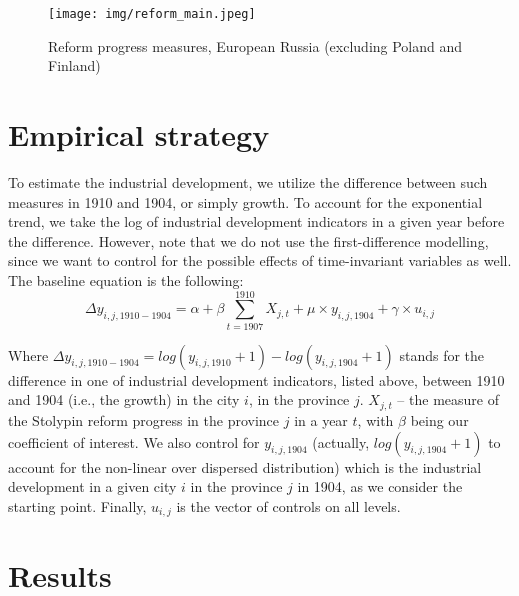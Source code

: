 \documentclass[a4paper, 12pt]{article}
\begin{document}
    
    \begin{figure}[!htbp]
        \centering
        \texttt{[image: img/reform\_main.jpeg]}
        \caption{Reform progress measures, European Russia (excluding Poland and Finland)}
        \label{fig:prog}
    \end{figure}
    
    
    
\section{Empirical strategy}    
    
    \noindent To estimate the industrial development, we utilize the difference between such measures in 1910 and 1904, or simply growth. To account for the exponential trend, we take the log of industrial development indicators in a given year before the difference. However, note that we do not use the first-difference modelling, since we want to control for the possible effects of time-invariant variables as well. The baseline equation is the following:
    \begin{equation}\label{eq:baseline}
        \Delta y_{i,j,1910-1904} = \alpha + \beta \sum_{t=1907}^{1910} X_{j,t} + \mu \times y_{i,j,1904} + \gamma \times u_{i,j}
    \end{equation}
    
    \noindent Where $\Delta y_{i,j,1910-1904} = log(y_{i,j,1910}+1) - log(y_{i,j,1904}+1)$ stands for the difference in one of industrial development indicators, listed above, between 1910 and 1904 (i.e., the growth) in the city $i$, in the province $j$. $X_{j,t}$ -- the measure of the Stolypin reform progress in the province $j$ in a year $t$, with $\hat\beta$ being our coefficient of interest. We also control for $y_{i,j,1904}$ (actually, $log(y_{i,j,1904}+1)$ to account for the non-linear over dispersed distribution) which is the industrial development in a given city $i$ in the province $j$ in 1904, as we consider the starting point. Finally, $u_{i,j}$ is the vector of controls on all levels.%
    
\section{Results}    
\end{document}

